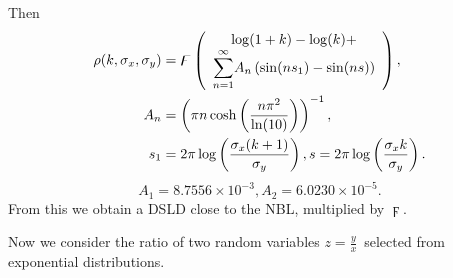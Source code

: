 \documentclass[titlepage,fleqn]{article}%
\begin{document}
Then%
\begin{align*}
\rho(k,\sigma_{x},\sigma_{y})  &  =\digamma\left(
\begin{array}
[c]{c}%
\log(1+k)-\log(k)+\\%
{\displaystyle\sum\limits_{n=1}^{\infty}}
A_{n}\left(  \sin(ns_{1}\right)  -\sin(ns))
\end{array}
\right)  ,\\
A_{n}  &  =\left(  \pi n\cosh\left(  \frac{n\pi^{2}}{\ln(10)}\right)  \right)
^{-1},\\
s_{1}  &  =2\pi\log\left(  \frac{\sigma_{x}(k+1)}{\sigma_{y}}\right)
,s=2\pi\log\left(  \frac{\sigma_{x}k}{\sigma_{y}}\right)  .
\end{align*}%
\[
A_{1}=8.7556\times10^{-3},A_{2}=6.0230\times10^{-5}.
\]
From this we obtain a DSLD close to the NBL, multiplied by $\digamma$.

Now we consider the ratio of two random variables $z=\frac{y}{x}$\ selected
from exponential distributions.
\end{document}
